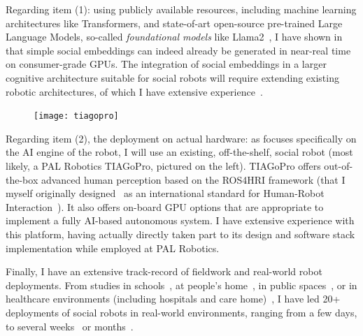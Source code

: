 Regarding item (1): using publicly available resources, including machine
learning architectures like Transformers, and state-of-art open-source
pre-trained Large Language Models, so-called \emph{foundational models} like
Llama2~\cite{touvron2023llama}, I have shown in~\cite{lemaignan2024social} that
simple social embeddings can indeed already be generated in near-real time on
consumer-grade GPUs. The integration of social embeddings in a larger cognitive
architecture suitable for social robots will require extending existing
robotic architectures, of which I have extensive
experience~\cite{lemaignan2017artificial, lemaignan2015pyrobots,
baxter2016cognitive,lemaignan2014challenges,lemaignan2011what}.

\begin{figure}
    \centering
    \vspace{-10pt}
    \texttt{[image: tiagopro]}
    \label{fig|tiagopro}
\end{figure}

Regarding item (2), the deployment on actual hardware: as \project focuses
specifically on the AI engine of the robot, I will use an existing,
off-the-shelf, social robot (most likely, a PAL Robotics TIAGoPro, pictured on
the left). TIAGoPro offers out-of-the-box advanced human perception based on the
ROS4HRI framework (that I myself originally
designed~\autocite{mohamed2021ros4hri} as an international standard for
Human-Robot Interaction~\autocite{lemaignan2022ros}). It also offers on-board
GPU options that are appropriate to implement a fully AI-based autonomous
system.  I have extensive experience with this platform, having actually
directly taken part to its design and software stack implementation while
employed at PAL Robotics.

Finally, I have an extensive track-record of fieldwork and real-world robot
deployments. From studies in schools~\autocite{hood2015when,
lemaignan2016learning, jacq2016building,
baxter2015wider,kennedy2016cautious,senft2018robots,lemaignan2022social}, at
people's home~\autocite{mondada2015ranger}, in public
spaces~\autocite{alhafnawi2022deliberative}, or in healthcare environments
(including hospitals and care
home)~\autocite{winkle2020couch,cooper2023challenges}, I have led 20+
deployments of social robots in real-world environments, ranging from a few
days, to several weeks~\autocite{jacq2016building,lemaignan2022social} or
months~\autocite{winkle2020couch}.





